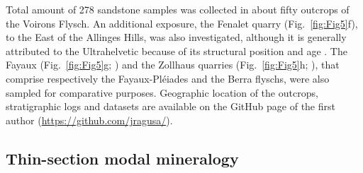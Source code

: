 \documentclass[twoside]{article}
\begin{document}
Total amount of 278 sandstone samples was collected in about fifty outcrops of the Voirons Flysch. An additional exposure, the Fenalet quarry (Fig.~\ref{fig:Fig5}f), to the East of the Allinges Hills, was also investigated, although it is generally attributed to the Ultrahelvetic because of its structural position and age \citep{Gagnebin1944,Badoux1962a,Badoux1965b,Badoux1996}. The Fayaux (Fig.~\ref{fig:Fig5}g; \citealp{Stuijvenberg1976}) and the Zollhaus quarries (Fig.~\ref{fig:Fig5}h; \citealp{Bouma1962,Crimes1981}), that comprise respectively the Fayaux-Pléiades and the Berra flyschs, were also sampled for comparative purposes. Geographic location of the outcrops, stratigraphic logs and datasets are available on the GitHub page of the first author (\url{https://github.com/jragusa/}).

\subsection{Thin-section modal mineralogy}
\end{document}
